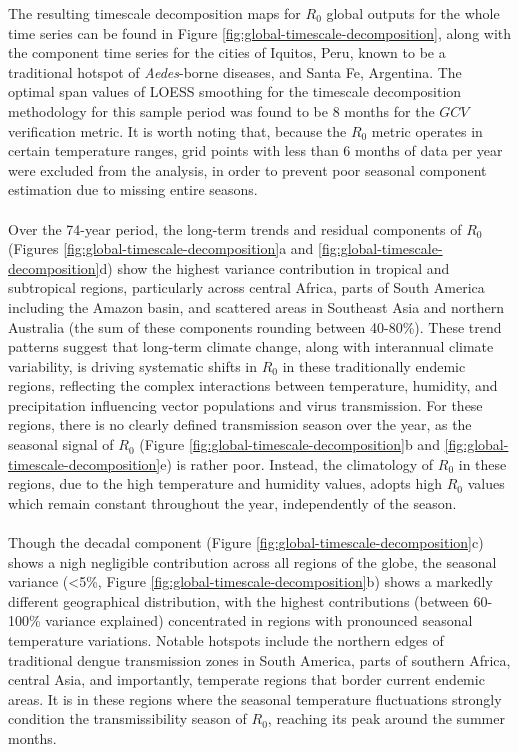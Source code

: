 \documentclass[10pt,twocolumn]{wlscirep}
\begin{document}
The resulting timescale decomposition maps for $R_0$ global outputs for the whole time series can be found in Figure \ref{fig:global-timescale-decomposition}, along with the component time series for the cities of Iquitos, Peru, known to be a traditional hotspot of \textit{Aedes}-borne diseases, and Santa Fe, Argentina. The optimal span values of LOESS smoothing for the timescale decomposition methodology for this sample period was found to be 8 months for the $GCV$ verification metric. It is worth noting that, because the $R_0$ metric operates in certain temperature ranges, grid points with less than 6 months of data per year were excluded from the analysis, in order to prevent poor seasonal component estimation due to missing entire seasons.
\\
\\
Over the 74-year period, the long-term trends and residual components of $R_0$ (Figures \ref{fig:global-timescale-decomposition}a and \ref{fig:global-timescale-decomposition}d) show the highest variance contribution in tropical and subtropical regions, particularly across central Africa, parts of South America including the Amazon basin, and scattered areas in Southeast Asia and northern Australia (the sum of these components rounding between 40-80\%). These trend patterns suggest that long-term climate change, along with interannual climate variability, is driving systematic shifts in $R_0$ in these traditionally endemic regions, reflecting the complex interactions between temperature, humidity, and precipitation influencing vector populations and virus transmission. For these regions, there is no clearly defined transmission season over the year, as the seasonal signal of $R_0$ (Figure \ref{fig:global-timescale-decomposition}b and \ref{fig:global-timescale-decomposition}e) is rather poor. Instead, the climatology of $R_0$ in these regions, due to the high temperature and humidity values, adopts high $R_0$ values which remain constant throughout the year, independently of the season.
\\
\\
Though the decadal component (Figure \ref{fig:global-timescale-decomposition}c) shows a nigh negligible contribution across all regions of the globe, the seasonal variance (<5\%, Figure \ref{fig:global-timescale-decomposition}b) shows a markedly different geographical distribution, with the highest contributions (between 60-100\% variance explained) concentrated in regions with pronounced seasonal temperature variations. Notable hotspots include the northern edges of traditional dengue transmission zones in South America, parts of southern Africa, central Asia, and importantly, temperate regions that border current endemic areas. It is in these regions where the seasonal temperature fluctuations strongly condition the transmissibility season of $R_0$, reaching its peak around the summer months.
\end{document}
